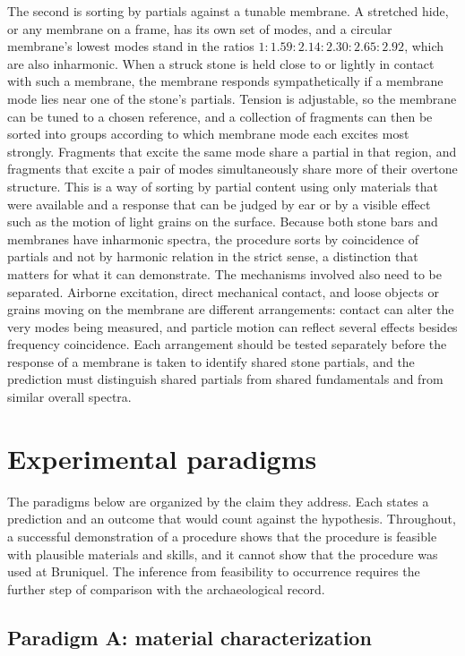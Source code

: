 \documentclass[12pt]{article}
\begin{document}
The second is sorting by partials against a tunable membrane. A stretched hide, or any membrane on a frame, has its own set of modes, and a circular membrane's lowest modes stand in the ratios $1 : 1.59 : 2.14 : 2.30 : 2.65 : 2.92$, which are also inharmonic. When a struck stone is held close to or lightly in contact with such a membrane, the membrane responds sympathetically if a membrane mode lies near one of the stone's partials. Tension is adjustable, so the membrane can be tuned to a chosen reference, and a collection of fragments can then be sorted into groups according to which membrane mode each excites most strongly. Fragments that excite the same mode share a partial in that region, and fragments that excite a pair of modes simultaneously share more of their overtone structure. This is a way of sorting by partial content using only materials that were available and a response that can be judged by ear or by a visible effect such as the motion of light grains on the surface. Because both stone bars and membranes have inharmonic spectra, the procedure sorts by coincidence of partials and not by harmonic relation in the strict sense, a distinction that matters for what it can demonstrate. The mechanisms involved also need to be separated. Airborne excitation, direct mechanical contact, and loose objects or grains moving on the membrane are different arrangements: contact can alter the very modes being measured, and particle motion can reflect several effects besides frequency coincidence. Each arrangement should be tested separately before the response of a membrane is taken to identify shared stone partials, and the prediction must distinguish shared partials from shared fundamentals and from similar overall spectra.

\section{Experimental paradigms}

The paradigms below are organized by the claim they address. Each states a prediction and an outcome that would count against the hypothesis. Throughout, a successful demonstration of a procedure shows that the procedure is feasible with plausible materials and skills, and it cannot show that the procedure was used at Bruniquel. The inference from feasibility to occurrence requires the further step of comparison with the archaeological record.

\subsection*{Paradigm A: material characterization}
\end{document}
